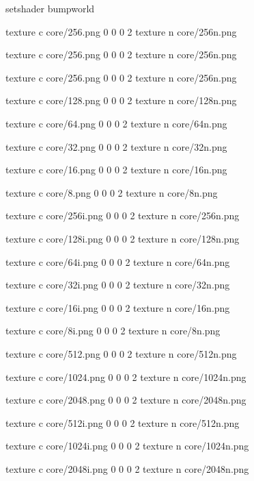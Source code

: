 setshader bumpworld

texture c core/256.png 0 0 0 2
texture n core/256n.png

texture c core/256.png 0 0 0 2
texture n core/256n.png

texture c core/256.png 0 0 0 2
texture n core/256n.png

texture c core/128.png 0 0 0 2
texture n core/128n.png

texture c core/64.png 0 0 0 2
texture n core/64n.png

texture c core/32.png 0 0 0 2
texture n core/32n.png

texture c core/16.png 0 0 0 2
texture n core/16n.png

texture c core/8.png 0 0 0 2
texture n core/8n.png

texture c core/256i.png 0 0 0 2
texture n core/256n.png

texture c core/128i.png 0 0 0 2
texture n core/128n.png

texture c core/64i.png 0 0 0 2
texture n core/64n.png

texture c core/32i.png 0 0 0 2
texture n core/32n.png

texture c core/16i.png 0 0 0 2
texture n core/16n.png

texture c core/8i.png 0 0 0 2
texture n core/8n.png

texture c core/512.png 0 0 0 2
texture n core/512n.png

texture c core/1024.png 0 0 0 2
texture n core/1024n.png

texture c core/2048.png 0 0 0 2
texture n core/2048n.png

texture c core/512i.png 0 0 0 2
texture n core/512n.png

texture c core/1024i.png 0 0 0 2
texture n core/1024n.png

texture c core/2048i.png 0 0 0 2
texture n core/2048n.png
